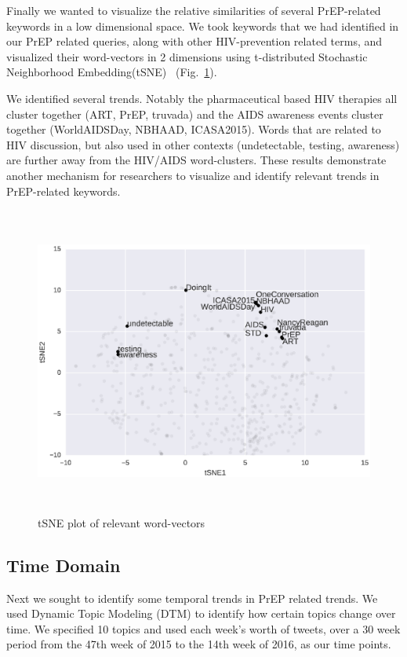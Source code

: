 \documentclass[conference]{IEEEtran}
\begin{document}
Finally we wanted to visualize the relative similarities of several PrEP-related keywords in a low dimensional space. We took keywords that we had identified in our PrEP related queries, along with other HIV-prevention related terms, and visualized their word-vectors in 2 dimensions using t-distributed Stochastic Neighborhood Embedding(tSNE)~\cite{van2008visualizing} (Fig.~\ref{fig:tsne}).

We identified several trends. Notably the pharmaceutical based HIV therapies all cluster together (ART, PrEP, truvada) and the AIDS awareness events cluster together (WorldAIDSDay, NBHAAD, ICASA2015). Words that are related to HIV discussion, but also used in other contexts (undetectable, testing, awareness) are further away from the HIV/AIDS word-clusters. These results demonstrate another mechanism for researchers to visualize and identify relevant trends in PrEP-related keywords.

\begin{figure}
\centering
\includegraphics[height=4in, width=6in]{figs/Fig2}
\caption{tSNE plot of relevant word-vectors}
\label{fig:tsne}
\end{figure}

\subsection{Time Domain}

Next we sought to identify some temporal trends in PrEP related trends. We used Dynamic Topic Modeling (DTM) to identify how certain topics change over time. We specified 10 topics and used each week's worth of tweets, over a 30 week period from the 47th week of 2015 to the 14th week of 2016, as our time points.
\end{document}
